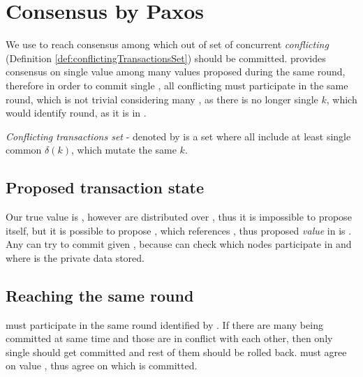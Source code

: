 
\section{Consensus by Paxos}
We use \paxos to reach consensus among \nodesTx which \transaction out of set of concurrent \emph{conflicting} \transactions (Definition \ref{def:conflictingTransactionsSet}) should be committed. \paxos provides consensus on single value among many values proposed during the same \paxos round, therefore in order to commit single \transaction, all conflicting \transactions must participate in the same \paxos round, which is not trivial considering many \mutationsFull, as there is no longer single $k$, which would identify \paxos round, as it is in \lwt.

\begin{definition}
\label{def:conflictingTransactionsSet}
\emph{Conflicting transactions set} - denoted by \conflictingTxSet is a set where all \transactions include at least single common $\delta(k)$, which mutate the same $k$.
\end{definition}

\subsection{Proposed transaction state}
Our true value is \transactionFull, however \mutationsFull are distributed over \nodesOfMutations, thus it is impossible to propose \transaction itself, but it is possible to propose \txState, which references \mutations, thus proposed \paxos \emph{value} in \mpt is \txState. Any  can try to commit \transaction given \txState, because  can check which nodes participate in \transaction and where is the private data stored. 



\subsection{Reaching the same \paxos round}
\conflictingTxSet must participate in the same \paxos round identified by \paxosRoundId.
If there are many \transactions being committed at same time and those \transactions are in conflict with each other, then only single \transaction should get committed and rest of them should be rolled back. \nodesTx must agree on \paxos value \txState, thus agree on which \transaction is committed.

